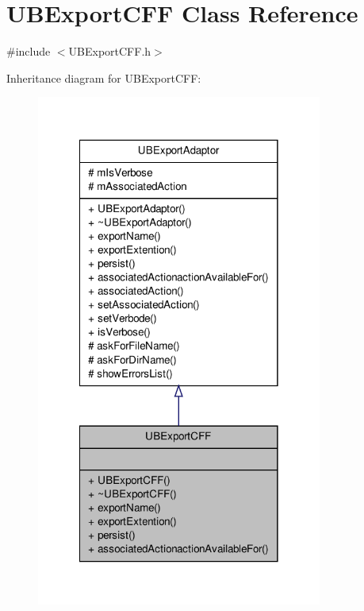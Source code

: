 \hypertarget{class_u_b_export_c_f_f}{\section{U\-B\-Export\-C\-F\-F Class Reference}
\label{d8/d52/class_u_b_export_c_f_f}
}


{\ttfamily \#include $<$U\-B\-Export\-C\-F\-F.\-h$>$}



Inheritance diagram for U\-B\-Export\-C\-F\-F\-:
\nopagebreak
\begin{figure}[H]
\begin{center}
\leavevmode
\includegraphics[width=266pt]{d6/d12/class_u_b_export_c_f_f__inherit__graph}
\end{center}
\end{figure}


